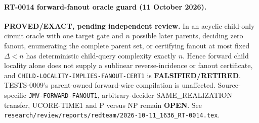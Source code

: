 \paragraph{RT-0014 forward-fanout oracle guard (11 October 2026).}
\textbf{PROVED/EXACT, pending independent review.}
In an acyclic child-only circuit oracle with one target gate and $n$ possible
later parents, deciding zero fanout, enumerating the complete parent set, or
certifying fanout at most fixed $\Delta<n$ has deterministic child-query
complexity exactly $n$.  Hence forward child locality alone does not supply
a sublinear reverse-incidence or fanout certificate, and
\texttt{CHILD-LOCALITY-IMPLIES-FANOUT-CERT1} is
\textbf{FALSIFIED/RETIRED}.  TESTS-0009's parent-owned forward-wire
compilation is unaffected.  Source-specific
\texttt{JMV-FORWARD-FANOUT1}, arbitrary-decider SAME\_REALIZATION transfer,
UCORE-TIME1 and P versus NP remain \textbf{OPEN}.  See
\texttt{research/review/reports/redteam/2026-10-11\_1636\_RT-0014.tex}.
